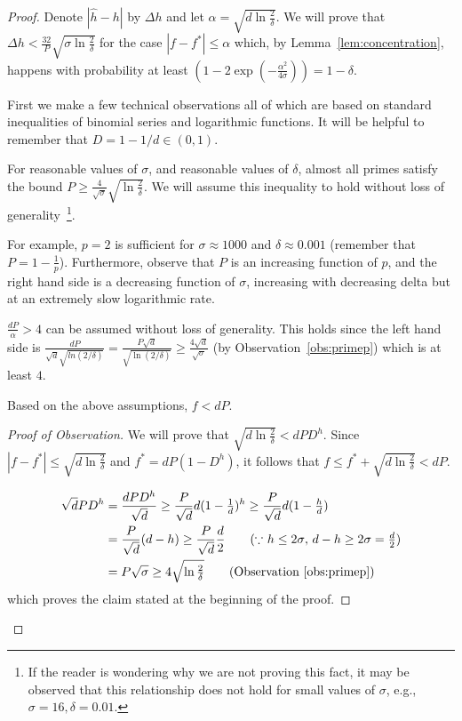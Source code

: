 \begin{proof}
    Denote $|\hat{h}-h|$ by $\Delta h$ and let $\alpha=\sqrt{d \ln
    \tfrac{2}{\delta}}$. We will prove that $\Delta h < \tfrac{32}{P}\sqrt{\sigma \ln \tfrac{2}{\delta}}$ for the case $|f-f^*| \le \alpha$ which, by
    Lemma~\ref{lem:concentration}, happens
    with probability at least $(1-2\exp{(-\tfrac{\alpha^2}{4\sigma})})=1-\delta$.

    First we make a few technical observations all of which are based on
    standard inequalities of binomial series and logarithmic functions.
    It will be helpful to remember that $D=1-1/d \in (0,1)$.
    \begin{obs}\label{obs:primep}
	For reasonable values of $\sigma$, and
	reasonable values of $\delta$, almost all
	primes satisfy the bound $P \ge \tfrac{4}{\sqrt{\sigma}}\sqrt{\ln
	\tfrac{2}{\delta}}$. We will assume this inequality to hold without loss
	of generality~\footnote{If the reader is wondering why we are not
	proving this fact, it may be observed that this relationship does not
	hold for small values of $\sigma$, e.g., $\sigma=16, \delta=0.01$.}.
    \end{obs}
    For example, $p=2$ is sufficient for $\sigma \approx 1000$ and $\delta
    \approx 0.001$ (remember that $P=1-\tfrac{1}{p}$). Furthermore, observe that
    $P$ is an increasing function of $p$, and the right hand side is a
    decreasing function of $\sigma$, increasing with decreasing delta but at an
    extremely slow logarithmic rate.
    
    \begin{obs}\label{obs:dp-alpha}
	$\tfrac{dP}{\alpha} > 4$ can be assumed without loss of generality. This holds since the left hand side is
	$\tfrac{dP}{\sqrt{d}\sqrt{ln(2/\delta)}} =
	\tfrac{P\sqrt{d}}{\sqrt{\ln(2/\delta)}} \ge
	\tfrac{4\sqrt{d}}{\sqrt{\sigma}}$ (by Observation~\ref{obs:primep})
	which is at least $4$.
    \end{obs}

    \begin{obs}\label{obs:f_less_than_dP}
	Based on the above assumptions, $f < dP$.
    \end{obs}
    \begin{proof}[Proof of Observation] We will prove that $\sqrt{d \ln \tfrac{2}{\delta}} < dPD^h$. Since $|f-f^*| \le \sqrt{d \ln \tfrac{2}{\delta}}$ and $f^*=dP(1-D^h)$, it follows that $f \le f^* + \sqrt{d \ln \tfrac{2}{\delta}} < dP$.

    \begin{align*}
	\sqrt{d}PD^h & = \frac{dPD^h}{\sqrt{d}} \ge \frac{P}{\sqrt{d}}d(1-\tfrac{1}{d})^h \ge \frac{P}{\sqrt{d}}d(1-\tfrac{h}{d})\\
		     & = \frac{P}{\sqrt{d}}(d-h) \ge \frac{P}{\sqrt{d}}\frac{d}{2} \tag{$\because$ $h \le 2\sigma$, $d-h \ge 2\sigma = \tfrac{d}{2}$}\\
		     & = P \sqrt{\sigma} \ge 4\sqrt{\ln \tfrac{2}{\delta}} \tag{Observation~\ref{obs:primep}}
    \end{align*}
    which proves the claim stated at the beginning of the proof.
    \end{proof}


\end{proof}
